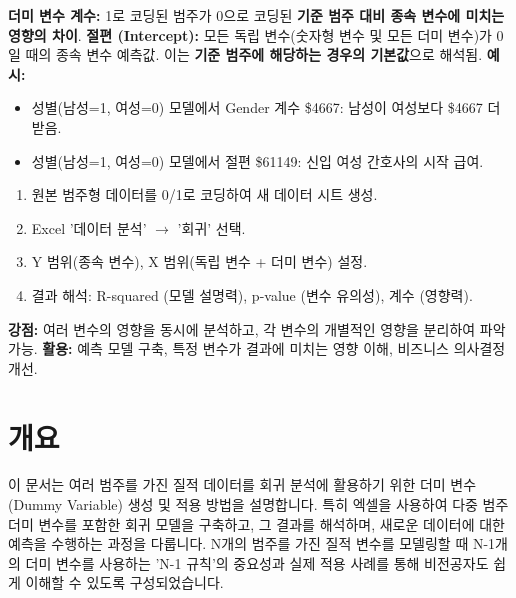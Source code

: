 \documentclass[11pt,a4paper]{article}
\begin{document}
\begin{tcolorbox}[colback=orange!5!white, colframe=orange!75!black, title=\textbf{회귀 계수 및 절편 해석}]
\textbf{더미 변수 계수:} 1로 코딩된 범주가 0으로 코딩된 \textbf{기준 범주 대비 종속 변수에 미치는 영향의 차이}.
\textbf{절편 (Intercept):} 모든 독립 변수(숫자형 변수 및 모든 더미 변수)가 0일 때의 종속 변수 예측값. 이는 \textbf{기준 범주에 해당하는 경우의 기본값}으로 해석됨.
\textbf{예시:}
\begin{itemize}
    \item 성별(남성=1, 여성=0) 모델에서 Gender 계수 \$4667: 남성이 여성보다 \$4667 더 받음.
    \item 성별(남성=1, 여성=0) 모델에서 절편 \$61149: 신입 여성 간호사의 시작 급여.
\end{itemize}
\end{tcolorbox}

\begin{tcolorbox}[colback=teal!5!white, colframe=teal!75!black, title=\textbf{Excel 활용 절차}]
\begin{enumerate}
    \item 원본 범주형 데이터를 0/1로 코딩하여 새 데이터 시트 생성.
    \item Excel '데이터 분석' $\rightarrow$ '회귀' 선택.
    \item Y 범위(종속 변수), X 범위(독립 변수 + 더미 변수) 설정.
    \item 결과 해석: R-squared (모델 설명력), p-value (변수 유의성), 계수 (영향력).
\end{enumerate}
\end{tcolorbox}

\begin{tcolorbox}[colback=gray!5!white, colframe=gray!75!black, title=\textbf{회귀 분석의 가치}]
\textbf{강점:} 여러 변수의 영향을 동시에 분석하고, 각 변수의 개별적인 영향을 분리하여 파악 가능.
\textbf{활용:} 예측 모델 구축, 특정 변수가 결과에 미치는 영향 이해, 비즈니스 의사결정 개선.
\end{tcolorbox}

\newpage

\newpage
\section*{개요}
이 문서는 여러 범주를 가진 질적 데이터를 회귀 분석에 활용하기 위한 더미 변수(Dummy Variable) 생성 및 적용 방법을 설명합니다. 특히 엑셀을 사용하여 다중 범주 더미 변수를 포함한 회귀 모델을 구축하고, 그 결과를 해석하며, 새로운 데이터에 대한 예측을 수행하는 과정을 다룹니다. N개의 범주를 가진 질적 변수를 모델링할 때 N-1개의 더미 변수를 사용하는 'N-1 규칙'의 중요성과 실제 적용 사례를 통해 비전공자도 쉽게 이해할 수 있도록 구성되었습니다.
\end{document}
